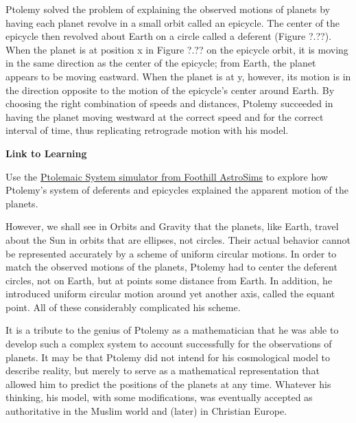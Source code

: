 \documentclass[main.tex]{subfiles}
\begin{document}
\vspace{1em}

Ptolemy solved the problem of explaining the observed motions of planets by having each planet revolve in a small orbit called an \gls{epicycle}. The center of the epicycle then revolved about Earth on a circle called a deferent (Figure ?.??). When the planet is at position x in Figure ?.?? on the epicycle orbit, it is moving in the same direction as the center of the epicycle; from Earth, the planet appears to be moving eastward. When the planet is at y, however, its motion is in the direction opposite to the motion of the epicycle's center around Earth. By choosing the right combination of speeds and distances, Ptolemy succeeded in having the planet moving westward at the correct speed and for the correct interval of time, thus replicating retrograde motion with his model.

\vspace{1em}


\begin{mdframed}[backgroundcolor=black!10]
    \textbf{Link to Learning}

    \vspace{1ex}

    Use the \href{https://openstax.org/l/30ptolemaic}{Ptolemaic System simulator from Foothill AstroSims} to explore how Ptolemy's system of deferents and epicycles explained the apparent motion of the planets.
\end{mdframed}

\vspace{1em}

However, we shall see in Orbits and Gravity that the planets, like Earth, travel about the Sun in orbits that are ellipses, not circles. Their actual behavior cannot be represented accurately by a scheme of uniform circular motions. In order to match the observed motions of the planets, Ptolemy had to center the deferent circles, not on Earth, but at points some distance from Earth. In addition, he introduced uniform circular motion around yet another axis, called the equant point. All of these considerably complicated his scheme.

\vspace{1em}

It is a tribute to the genius of Ptolemy as a mathematician that he was able to develop such a complex system to account successfully for the observations of planets. It may be that Ptolemy did not intend for his cosmological model to describe reality, but merely to serve as a mathematical representation that allowed him to predict the positions of the planets at any time. Whatever his thinking, his model, with some modifications, was eventually accepted as authoritative in the Muslim world and (later) in Christian Europe.
\end{document}
